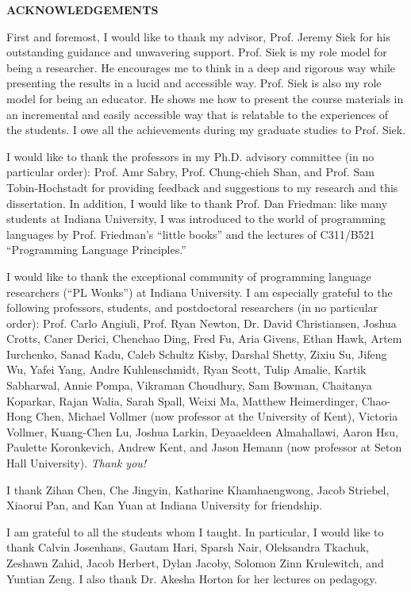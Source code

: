 \begin{centering}
\textbf{ACKNOWLEDGEMENTS}\\
\vspace{\baselineskip}
\end{centering}

First and foremost, I would like to thank my advisor, Prof. Jeremy Siek for his
outstanding guidance and unwavering support. Prof. Siek is my role model for
being a researcher. He encourages me to think in a deep and rigorous way while
presenting the results in a lucid and accessible way. Prof. Siek is also my role
model for being an educator. He shows me how to present the course materials in
an incremental and easily accessible way that is relatable to the experiences of
the students. I owe all the achievements during my graduate studies to Prof.
Siek.

I would like to thank the professors in my Ph.D. advisory committee (in no
particular order): Prof. Amr Sabry, Prof. Chung-chieh Shan, and Prof. Sam
Tobin-Hochstadt for providing feedback and suggestions to my research and this
dissertation. In addition, I would like to thank Prof. Dan Friedman: like many
students at Indiana University, I was introduced to the world of programming
languages by Prof. Friedman's ``little books'' and the lectures of C311/B521
``Programming Language Principles.''

I would like to thank the exceptional community of programming language
researchers (``PL Wonks'') at Indiana University. I am especially grateful to
the following professors, students, and postdoctoral researchers (in no
particular order): Prof. Carlo Angiuli, Prof. Ryan Newton, Dr. David
Christiansen, Joshua Crotts, Caner Derici, Chenchao Ding, Fred Fu, Aria Givens,
Ethan Hawk, Artem Iurchenko, Sanad Kadu, Caleb Schultz Kisby, Darshal Shetty,
Zixiu Su, Jifeng Wu, Yafei Yang, Andre Kuhlenschmidt, Ryan Scott, Tulip Amalie,
Kartik Sabharwal, Annie Pompa, Vikraman Choudhury, Sam Bowman, Chaitanya
Koparkar, Rajan Walia, Sarah Spall, Weixi Ma, Matthew Heimerdinger, Chao-Hong
Chen, Michael Vollmer (now professor at the University of Kent), Victoria
Vollmer, Kuang-Chen Lu, Joshua Larkin, Deyaaeldeen Almahallawi, Aaron Hsu,
Paulette Koronkevich, Andrew Kent, and Jason Hemann (now professor at Seton Hall
University). \textit{Thank you!}

I thank Zihan Chen, Che Jingyin, Katharine Khamhaengwong, Jacob Striebel,
Xiaorui Pan, and Kan Yuan at Indiana University for friendship.

I am grateful to all the students whom I taught. In particular, I would like to
thank Calvin Josenhans, Gautam Hari, Sparsh Nair, Oleksandra Tkachuk, Zeshawn
Zahid, Jacob Herbert, Dylan Jacoby, Solomon Zinn Krulewitch, and Yuntian Zeng. I
also thank Dr. Akesha Horton for her lectures on pedagogy.

